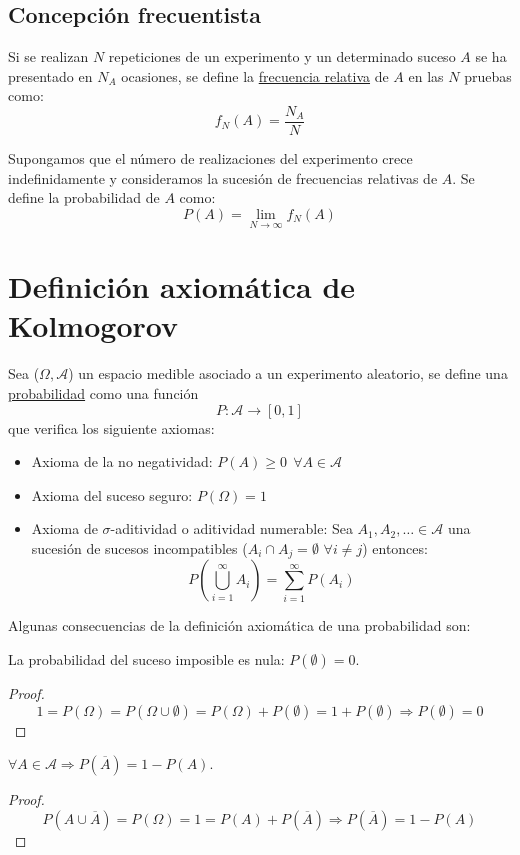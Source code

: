 \subsection{Concepción frecuentista}

Si se realizan $N$ repeticiones de un experimento y un determinado suceso $A$ se ha presentado en $N_A$
ocasiones, se define la \underline{frecuencia relativa} de $A$ en las $N$ pruebas como:
$$f_N(A) = \dfrac{N_A}{N}$$


Supongamos que el número de realizaciones del experimento crece indefinidamente y consideramos la sucesión
de frecuencias relativas de $A$. Se define la probabilidad de $A$ como:
$$P(A) = \lim_{N \to \infty} f_N(A)$$

\section{Definición axiomática de Kolmogorov}

Sea ($\Omega, \mathcal{A}$) un espacio medible asociado a un experimento aleatorio, se define una
\underline{probabilidad} como una función
$$P: \mathcal{A} \rightarrow [0,1]$$
que verifica los siguiente axiomas:
\begin{itemize}
  \item Axioma de la no negatividad: $P(A) \geq 0~~\forall A \in \mathcal{A}$
  \item Axioma del suceso seguro: $P(\Omega) = 1$
  \item Axioma de $\sigma$-aditividad o aditividad numerable:
        Sea $A_1, A_2, \ldots \in \mathcal{A}$ una sucesión de sucesos incompatibles ($A_i \cap A_j = \emptyset$
        $\forall i \neq j$) entonces:
        $$P\left(\bigcup_{i=1}^\infty A_i \right) = \sum_{i=1}^\infty P(A_i)$$
\end{itemize}

Algunas consecuencias de la definición axiomática de una probabilidad son:
\begin{prop}
    La probabilidad del suceso imposible es nula: $P(\emptyset)=0$.
\end{prop}
\begin{proof}
  $$1 = P(\Omega) = P(\Omega \cup \emptyset) = P(\Omega) + P(\emptyset) = 1 + P(\emptyset) \Rightarrow
    P(\emptyset) = 0$$
\end{proof}

\begin{prop}
    $\forall A \in \mathcal{A} \Rightarrow P(\overline{A}) = 1-P(A)$.
\end{prop}
\begin{proof}
  $$P(A \cup \overline{A}) = P(\Omega) = 1 = P(A) + P(\overline{A}) \Rightarrow P(\overline{A}) = 1 - P(A)$$
\end{proof}

